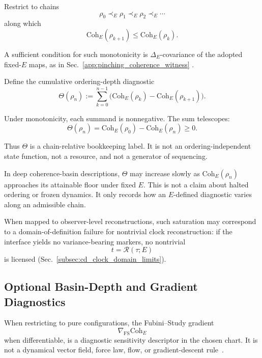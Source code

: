 \documentclass[aps,prx,onecolumn,11pt]{revtex4-2}
\theoremstyle{plain}
\theoremstyle{definition}
\theoremstyle{remark}
\begin{document}
Restrict to chains
\[
\rho_0\prec_E\rho_1\prec_E\rho_2\prec_E\cdots
\]
along which
\[
\mathrm{Coh}_E(\rho_{k+1})
\leq
\mathrm{Coh}_E(\rho_k).
\]

A sufficient condition for such monotonicity is
\(\Delta_E\)-covariance of the adopted fixed-\(E\) maps, as in
Sec.~\ref{app:pinching_coherence_witness}
\cite{Petz1986,Baumgratz2014,ChitambarGour2019,Wilde2017}.

Define the cumulative ordering-depth diagnostic
\begin{equation}
\Theta(\rho_n)
:=
\sum_{k=0}^{n-1}
\bigl(
\mathrm{Coh}_E(\rho_k)
-
\mathrm{Coh}_E(\rho_{k+1})
\bigr).
\label{eq:theta_def}
\end{equation}

Under monotonicity, each summand is nonnegative. The sum telescopes:
\begin{equation}
\Theta(\rho_n)
=
\mathrm{Coh}_E(\rho_0)
-
\mathrm{Coh}_E(\rho_n)
\geq 0.
\label{eq:theta_telescope}
\end{equation}

Thus \(\Theta\) is a chain-relative bookkeeping label. It is not an
ordering-independent state function, not a resource, and not a
generator of sequencing.

In deep coherence-basin descriptions, \(\Theta\) may increase slowly as
\(\mathrm{Coh}_E(\rho_n)\) approaches its attainable floor under fixed
\(E\). This is not a claim about halted ordering or frozen dynamics. It
only records how an \(E\)-defined diagnostic varies along an admissible
chain.

When mapped to observer-level reconstructions, such saturation may
correspond to a domain-of-definition failure for nontrivial clock
reconstruction: if the interface yields no variance-bearing markers, no
nontrivial
\[
t=\mathcal R(\tau;E)
\]
is licensed
(Sec.~\ref{subsec:cd_clock_domain_limits}).

\subsection{Optional Basin-Depth and Gradient Diagnostics}
\label{app:basin_depth_gradients}

When restricting to pure configurations, the Fubini--Study gradient
\[
\nabla_{\mathrm{FS}}\mathrm{Coh}_E
\]
when differentiable, is a diagnostic sensitivity descriptor in the
chosen chart. It is not a dynamical vector field, force law, flow, or
gradient-descent rule~\cite{BengtssonZyczkowski2006,Nakahara2003}.
\end{document}
